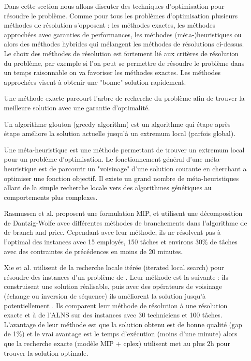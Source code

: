 Dans cette section nous allons discuter des techniques d'optimisation pour résoudre le problème. Comme pour tous les problèmes d'optimisation plusieurs méthodes de résolution s'opposent : les méthodes exactes, les méthodes approchées avec garanties de performances, les méthodes \mbox{(méta-)heuristiques} ou alors des méthodes hybrides qui mélangent les méthodes de résolutions ci-dessus. Le choix des méthodes de résolution est fortement lié aux critères de résolution du problème, par exemple si l'on peut se permettre de résoudre le problème dans un temps raisonnable on va favoriser les méthodes exactes. Les méthodes approchées visent à obtenir une "bonne" solution rapidement.
\begin{mydef}
\label{def:exact2}
Une méthode exacte parcourt l'arbre de recherche du problème afin de trouver la meilleure solution avec une garantie d'optimalité.
\end{mydef}
\begin{mydef}
\label{def:greedy2}
Un algorithme glouton (greedy algorithm) est un algorithme qui étape après étape améliore la solution actuelle jusqu'à un extremum local (parfois global). 
\end{mydef}
\begin{mydef}
\label{def:metaheuristic2}
Une méta-heuristique est une méthode permettant de trouver un extremum local pour un problème d'optimisation. Le fonctionnement général d'une méta-heuristique est de parcourir un "voisinage" d'une solution courante en cherchant a optimiser une fonction objectif. Il existe un grand nombre de méta-heuristiques allant de la simple recherche locale vers des algorithmes génétiques au comportements plus complexes.
\end{mydef}

Rasmussen et al. \cite{Rasmussen2010} proposent une formulation MIP, et utilisent une décomposition de Dantzig-Wolfe avec différentes méthodes de branchements dans l'algorithme de de branch-and-price. Cependant avec leur méthode, ils ne résolvent pas à l'optimal des instances avec 15 employés, 150 tâches et environs 30\% de tâches avec des contraintes de précédences en moins de 20 minutes.

Xie et al. \cite{Xie2017} utilisent de la recherche locale itérée (iterated local search) pour résoudre des instances d'un problème de \wsrp. Leur méthode est la suivante : ils construisent une solution réalisable, puis avec des opérateurs de voisinage (échange ou inversion de séquence) ils améliorent la solution jusqu'à potentiellement . Ils comparent leur méthode de résolution à une résolution exacte et à de l'ALNS sur des instances avec 30 techniciens et 100 tâches. L'avantage de leur méthode est que la solution obtenu est de bonne qualité (gap de 1\%) et le vrai avantage est le temps d'exécution (moins d'une minute) alors que la recherche exacte (modèle MIP + cplex) utilisent met au plus 2h pour trouver la solution optimale.

